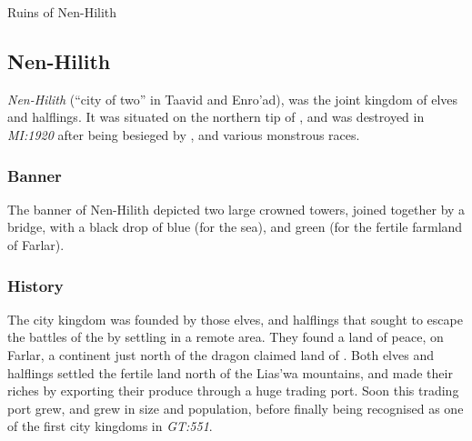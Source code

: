 \cleardoubleevenemptypage


\begin{infobox}{Ruins of Nen-Hilith}
  \begin{multicols}{2}
    \begin{itemize}[label={},noitemsep,leftmargin=0.0cm,topsep=0pt]
    \end{itemize}
  \end{multicols}
\end{infobox}

\clearpage

\subsection{Nen-Hilith}
\label{sec:Nen-Hilith}

\emph{Nen-Hilith} (``city of two'' in Taavid and Enro'ad), was the joint
kingdom of elves and halflings. It was situated on the northern tip of
, and was destroyed in \emph{MI:1920} after being besieged
by , and various monstrous races.

\subsubsection{Banner}

The banner of Nen-Hilith depicted two large crowned towers, joined together
by a bridge, with a black drop of blue (for the sea), and green (for the
fertile farmland of Farlar).

\subsubsection{History}

The city kingdom was founded by those elves, and halflings that sought to
escape the battles of the  by settling in a remote area.
They found a land of peace, on Farlar, a continent just north of the dragon
claimed land of . Both elves and halflings settled
the fertile land north of the Lias'wa mountains, and made their riches by
exporting their produce through a huge trading port. Soon this trading port
grew, and grew in size and population, before finally being recognised as
one of the first city kingdoms in \emph{GT:551}.

